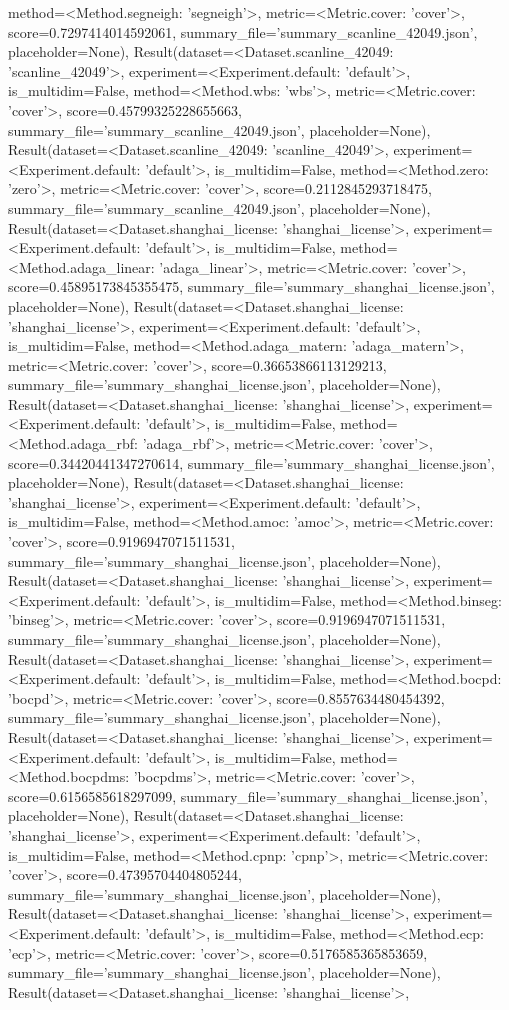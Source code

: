 method=<Method.segneigh: 'segneigh'>, metric=<Metric.cover: 'cover'>, score=0.7297414014592061, summary_file='summary_scanline_42049.json', placeholder=None), Result(dataset=<Dataset.scanline_42049: 'scanline_42049'>, experiment=<Experiment.default: 'default'>, is_multidim=False, method=<Method.wbs: 'wbs'>, metric=<Metric.cover: 'cover'>, score=0.45799325228655663, summary_file='summary_scanline_42049.json', placeholder=None), Result(dataset=<Dataset.scanline_42049: 'scanline_42049'>, experiment=<Experiment.default: 'default'>, is_multidim=False, method=<Method.zero: 'zero'>, metric=<Metric.cover: 'cover'>, score=0.2112845293718475, summary_file='summary_scanline_42049.json', placeholder=None), Result(dataset=<Dataset.shanghai_license: 'shanghai_license'>, experiment=<Experiment.default: 'default'>, is_multidim=False, method=<Method.adaga_linear: 'adaga_linear'>, metric=<Metric.cover: 'cover'>, score=0.45895173845355475, summary_file='summary_shanghai_license.json', placeholder=None), Result(dataset=<Dataset.shanghai_license: 'shanghai_license'>, experiment=<Experiment.default: 'default'>, is_multidim=False, method=<Method.adaga_matern: 'adaga_matern'>, metric=<Metric.cover: 'cover'>, score=0.36653866113129213, summary_file='summary_shanghai_license.json', placeholder=None), Result(dataset=<Dataset.shanghai_license: 'shanghai_license'>, experiment=<Experiment.default: 'default'>, is_multidim=False, method=<Method.adaga_rbf: 'adaga_rbf'>, metric=<Metric.cover: 'cover'>, score=0.34420441347270614, summary_file='summary_shanghai_license.json', placeholder=None), Result(dataset=<Dataset.shanghai_license: 'shanghai_license'>, experiment=<Experiment.default: 'default'>, is_multidim=False, method=<Method.amoc: 'amoc'>, metric=<Metric.cover: 'cover'>, score=0.9196947071511531, summary_file='summary_shanghai_license.json', placeholder=None), Result(dataset=<Dataset.shanghai_license: 'shanghai_license'>, experiment=<Experiment.default: 'default'>, is_multidim=False, method=<Method.binseg: 'binseg'>, metric=<Metric.cover: 'cover'>, score=0.9196947071511531, summary_file='summary_shanghai_license.json', placeholder=None), Result(dataset=<Dataset.shanghai_license: 'shanghai_license'>, experiment=<Experiment.default: 'default'>, is_multidim=False, method=<Method.bocpd: 'bocpd'>, metric=<Metric.cover: 'cover'>, score=0.8557634480454392, summary_file='summary_shanghai_license.json', placeholder=None), Result(dataset=<Dataset.shanghai_license: 'shanghai_license'>, experiment=<Experiment.default: 'default'>, is_multidim=False, method=<Method.bocpdms: 'bocpdms'>, metric=<Metric.cover: 'cover'>, score=0.6156585618297099, summary_file='summary_shanghai_license.json', placeholder=None), Result(dataset=<Dataset.shanghai_license: 'shanghai_license'>, experiment=<Experiment.default: 'default'>, is_multidim=False, method=<Method.cpnp: 'cpnp'>, metric=<Metric.cover: 'cover'>, score=0.47395704404805244, summary_file='summary_shanghai_license.json', placeholder=None), Result(dataset=<Dataset.shanghai_license: 'shanghai_license'>, experiment=<Experiment.default: 'default'>, is_multidim=False, method=<Method.ecp: 'ecp'>, metric=<Metric.cover: 'cover'>, score=0.5176585365853659, summary_file='summary_shanghai_license.json', placeholder=None), Result(dataset=<Dataset.shanghai_license: 'shanghai_license'>, 